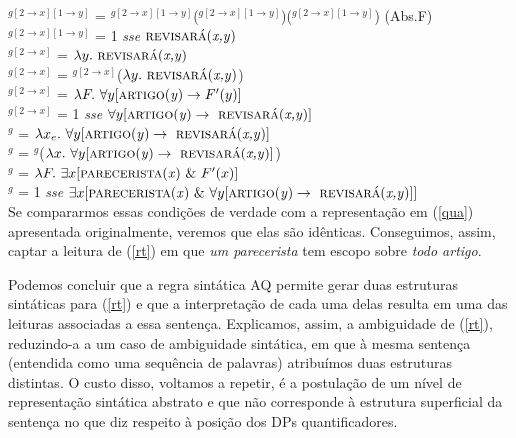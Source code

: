 \n {}$^{g[2\rightarrow x][1\rightarrow y]}$ = $^{g[2\rightarrow x][1\rightarrow y]}$($^{g[2\rightarrow x][1\rightarrow y]}$)($^{g[2\rightarrow x][1\rightarrow y]}$)  \hfill (Abs.F)\\

\n {}$^{g[2\rightarrow x][1\rightarrow y]}$ = 1 \textit{sse}
$\text{\textsc{revisará}(\textit{x,y})}$\\

\n {}$^{g[2\rightarrow x]}$ = $\lambda y.\ \predica{revisará}{x,y}$\\

\n {}$^{g[2\rightarrow x]}$ = $^{g[2\rightarrow
x]}$($\lambda y.\ \predica{revisará}{x,y}$)\\

\n {}$^{g[2\rightarrow x]}$ = $\lambda F.\ \forall y [\text{\textsc{artigo}(\textit{y})} \rightarrow F'(y)]$\\

\n {}$^{g[2\rightarrow x]}$ = 1 \textit{sse} $\forall y [\text{\textsc{artigo}(\textit{y})} \rightarrow\ \text{\textsc{revisará}(\textit{x,y})}]$\\

\n {}$^{g}$ = $\lambda x_{e}.\ \forall y [\text{\textsc{artigo}(\textit{y})} \rightarrow\ \text{\textsc{revisará}(\textit{x,y})}]$\\

\n {}$^{g}$ = $^{g}$($\lambda x.\ \forall y [\text{\textsc{artigo}(\textit{y})} \rightarrow\ \text{\textsc{revisará}(\textit{x,y})}]$)\\

\n {}$^{g}$ = $\lambda F.\
\exists x [\text{\textsc{parecerista}(\textit{x})}\ \&\ F'(x)]$\\

\n {}$^{g}$ = 1 \textit{sse} $\exists x [\text{\textsc{parecerista}(\textit{x})}\ \&\ \forall y [\text{\textsc{artigo}(\textit{y})} \rightarrow\ \text{\textsc{revisará}(\textit{x,y})}]]$\\

\n Se compararmos essas condições de verdade com a representação
em (\ref{qua}) apresentada originalmente, veremos que elas são idênticas.
Conseguimos, assim, captar a leitura de (\ref{rt}) em que
\textit{um parecerista} tem escopo sobre \textit{todo artigo}.

Podemos concluir que a regra sintática AQ permite gerar duas
estruturas sintáticas para (\ref{rt}) e que a interpretação de
cada uma delas resulta em uma das leituras associadas a essa
sentença. Explicamos, assim, a ambiguidade de (\ref{rt}),
reduzindo-a a um caso de ambiguidade sintática, em que à mesma
sentença (entendida como uma sequência de palavras) atribuímos
duas estruturas distintas. O custo disso, voltamos a repetir, é a postulação de um nível de representação sintática abstrato e que não corresponde à estrutura superficial da sentença no que diz respeito à posição dos DPs quantificadores.


